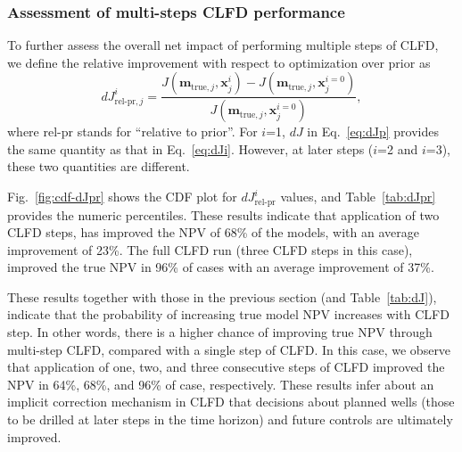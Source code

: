 \documentclass[11pt]{article}
\begin{document}


\subsubsection{Assessment of multi-steps CLFD performance} \label{results:multiruns}
To further assess the overall net impact of performing multiple steps of CLFD, we define the relative improvement with respect
to optimization over prior as
%
\begin{equation}  \label{eq:dJp}
dJ_{\text{rel-pr},j}^{i} =  \frac{J(\mathbf{m}_{\text{true},j},\mathbf{x}^i_j) - J(\mathbf{m}_{\text{true},j},\mathbf{x}^{i=0}_j)}{J(\mathbf{m}_{\text{true},j},\mathbf{x}^{i=0}_j)},
\end{equation}
%
where rel-pr stands for ``relative to prior''.
For $i$=1, $dJ$ in Eq.~\ref{eq:dJp} provides the same quantity as that in Eq.~\ref{eq:dJi}.
However, at later steps ($i$=2 and $i$=3), these two quantities are different.

Fig.~\ref{fig:cdf-dJpr} shows the CDF plot for $dJ_{\text{rel-pr}}^{i}$ values, and Table~\ref{tab:dJpr} provides the numeric percentiles.
These results indicate that application of two CLFD steps,
has improved the NPV of 68\% of the models, with an average improvement of 23\%.
The full CLFD run (three CLFD steps in this case), improved the true NPV in 96\% of cases
with an average improvement of 37\%.


These results together with those in the previous section (and Table~\ref{tab:dJ}),
indicate that the probability of increasing true model NPV increases with CLFD step.
In other words, there is a higher chance of improving true NPV through multi-step CLFD,
compared with a single step of CLFD.
In this case, we observe that
application of one, two, and three consecutive steps of CLFD improved the NPV in 64\%, 68\%,
and 96\% of case, respectively.
These results infer about an implicit correction mechanism in CLFD that decisions
about planned wells (those to be drilled at later steps in the time horizon) and future controls are ultimately improved.
\end{document}
